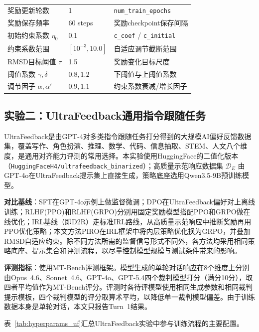 \begin{table}[htbp]
\begin{tabular*}{0.98\textwidth}{@{\extracolsep{\fill}}lll@{}}
        奖励更新轮数 & 1 & \texttt{num\_train\_epochs} \\
        奖励保存频率 & 60 steps & 奖励checkpoint保存间隔 \\
        初始约束系数 $\eta_0$ & 0.1 & \texttt{c\_coef} / \texttt{c\_initial} \\
        约束系数范围 & $[10^{-3},10.0]$ & 自适应调节截断范围 \\
        RMSD目标阈值 $\tau$ & 1.5 & 奖励变化目标尺度 \\
        阈值系数 $\gamma,\delta$ & $0.8,1.2$ & 下阈值与上阈值系数 \\
        调节因子 $\alpha,\alpha'$ & $0.9,1.1$ & 约束系数衰减/增长因子 \\
        \bottomrule
    \end{tabular*}
\end{table}

\subsection{实验二：UltraFeedback通用指令跟随任务}

UltraFeedback\cite{cui2023ultrafeedback}是由GPT-4对多类指令跟随任务打分得到的大规模AI偏好反馈数据集，覆盖写作、角色扮演、推理、数学、代码、信息抽取、STEM、人文八个维度，是通用对齐能力评测的常用选择。本实验使用HuggingFace的二值化版本（\texttt{HuggingFaceH4/ultrafeedback\_binarized}）；高质量示范响应数据集 $\mathcal{D}_E$ 由GPT-4o在UltraFeedback提示集上直接生成，策略底座选用Qwen3.5-9B预训练模型。

\textbf{对比基线}：SFT在GPT-4o示例上做监督微调；DPO\cite{rafailov2023direct}在UltraFeedback偏好对上离线训练；RLHF(PPO)\cite{ouyang2022training}和RLHF(GRPO)\cite{shao2024deepseekmath}分别用固定奖励模型搭配PPO和GRPO做在线优化；IRL基线（即D2R\cite{zeng2025d2r}）走标准IRL路线，从高质量示范响应中推断奖励再用PPO优化策略；本文方法PIRO在IRL框架中将内层策略优化换为GRPO，并叠加RMSD自适应约束。除不同方法所需的监督信号形式不同外，各方法均采用相同策略底座、提示集合和评测流程，以尽量控制模型规模与测试条件带来的影响。

\textbf{评测指标}：使用MT-Bench\cite{zheng2023judging}评测框架。模型生成的单轮对话响应在8个维度上分别由Opus~4.6、Sonnet~4.6、GPT-4o、GPT-5.4四个裁判模型打分（满分10分），取四者平均值作为MT-Bench评分。评测时各待评模型使用相同生成参数和相同裁判提示模板，四个裁判模型的评分取算术平均，以降低单一裁判模型偏差。由于训练数据本身是单轮对话，本文只报告Turn~1结果。

表~\ref{tab:hyperparams_uf}汇总UltraFeedback实验中参与训练流程的主要配置。

